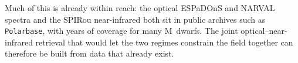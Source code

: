 Much of this is already within reach: the optical ESPaDOnS and NARVAL spectra and the SPIRou near-infrared both sit in public archives such as \texttt{Polarbase}, with years of coverage for many M~dwarfs. The joint optical--near-infrared retrieval that would let the two regimes constrain the field together can therefore be built from data that already exist.





